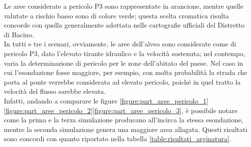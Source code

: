Le aree considerate a pericolo P3 sono rappresentate in arancione, mentre quelle valutate a rischio basso sono di colore verde; questa scelta cromatica risulta concorde con quella generalmente adottata nelle cartografie ufficiali del Distretto di Bacino.\\
In tutti e tre i scenari, ovviamente, le aree dell'alveo sono considerate come di pericolo P3, dato l'elevato tirante idraulico e la velocità sostenuta; nel contempo, varia la determinazione di pericolo per le zone dell'abitato del paese. Nel caso in cui l'esondazione fosse maggiore, per esempio, con molta probabilità la strada che porta al ponte verrebbe considerata ad elevato pericolo, poiché in quel tratto la velocità del flusso sarebbe elevata.\\
Infatti, andando a comparare le figure \eqref{figure:part_aree_pericolo_1}\eqref{figure:part_aree_pericolo_2}\eqref{figure:part_aree_pericolo_3}, è possibile notare come la prima e la terza simulazione producano all'incirca la stessa esondazione, mentre la seconda simulazione genera una maggiore area allagata. Questi risultati sono concordi con quanto riportato nella tabella \eqref{table:risultati_arginatura}.